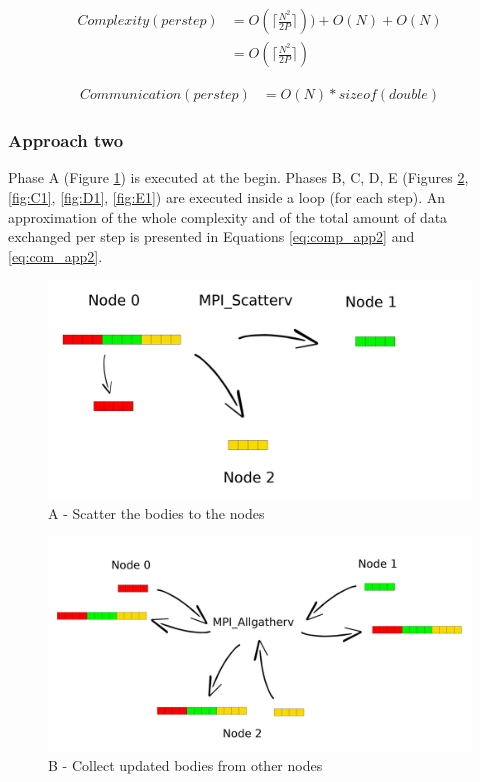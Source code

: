 \documentclass[a4paper]{article}
\begin{document}
\begin{equation} \label{eq:comp_app1}
\begin{split}
Complexity (per step) & = O(\lceil\frac{N^2}{2P}\rceil)) + O(N) + O(N)\\
 & = O(\lceil\frac{N^2}{2P}\rceil)
\end{split}
\end{equation}

\begin{equation} \label{eq:com_app1}
\begin{split}
Communication (per step) & = O(N)*sizeof(double)
\end{split}
\end{equation}

\subsubsection{Approach two}
\label{sec:app_1}
Phase A (Figure \ref{fig:A1}) is executed at the begin. Phases B, C, D, E (Figures \ref{fig:B1}, \ref{fig:C1}, \ref{fig:D1}, \ref{fig:E1}) are executed inside a loop (for each step). An approximation of the whole complexity and of the total amount of data exchanged per step is presented in Equations \ref{eq:comp_app2} and \ref{eq:com_app2}.

\begin{figure}[ht]
  \centering
  \includegraphics[width=0.6\linewidth]{scatter}
  \caption{A - Scatter the bodies to the nodes}
  \label{fig:A1}
\end{figure}
\FloatBarrier

\begin{figure}[ht]
  \centering
  \includegraphics[width=0.5\linewidth]{MPI_all_gather}
  \caption{B - Collect updated bodies from other nodes}
  \label{fig:B1}
\end{figure}
\FloatBarrier
\end{document}
